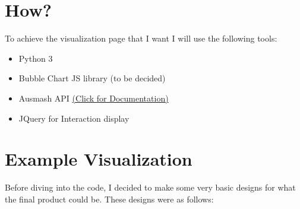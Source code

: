 \documentclass[11pt, oneside, a4paper]{article}
\begin{document}
\section*{How?}
To achieve the visualization page that I want I will use the following tools:
\begin{itemize}
    \item Python 3
    \item Bubble Chart JS library (to be decided)
    \item Ausmash API \href{https://api.ausmash.com.au/swagger/ui/index#/}{(Click for Documentation)}
    \item JQuery for Interaction display
\end{itemize}

\section*{Example Visualization}
Before diving into the code, I decided to make some very basic designs for what the final product could be. These designs were as follows:
\end{document}
